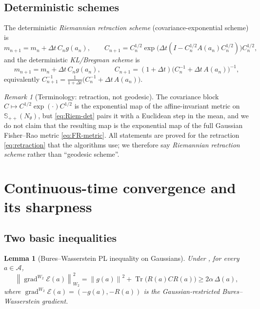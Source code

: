 \documentclass[11pt]{article}
\theoremstyle{plain}
\newtheorem{lemma}[lemma]{Lemma}
\theoremstyle{definition}
\theoremstyle{remark}
\newtheorem{remark}[remark]{Remark}
\newcommand{\Tr}{\operatorname{Tr}}
\newcommand{\SPD}{\mathbb{S}_{++}}
\newcommand{\Id}{I}
\newcommand{\grad}{\operatorname{grad}}
\newcommand{\calE}{\mathcal{E}}
\newcommand{\Aspace}{\mathcal{A}}
\newcommand{\norm}[1]{\left\lVert #1\right\rVert}
\begin{document}
\subsection{Deterministic schemes}

The deterministic \emph{Riemannian retraction scheme} (covariance-exponential scheme) is
\begin{equation}
\label{eq:Riem-det}
    m_{n+1}=m_n+\Delta t\,C_ng(a_n),
    \qquad
    C_{n+1}=C_n^{1/2}\exp\bigl(\Delta t(\Id-C_n^{1/2}A(a_n)C_n^{1/2})\bigr)C_n^{1/2},
\end{equation}
and the deterministic \emph{KL/Bregman scheme} is
\begin{equation}
\label{eq:KL-det}
    m_{n+1}=m_n+\Delta t\,C_ng(a_n),
    \qquad
    C_{n+1}=(1+\Delta t)\bigl(C_n^{-1}+\Delta t\,A(a_n)\bigr)^{-1},
\end{equation}
equivalently $C_{n+1}^{-1}=\tfrac1{1+\Delta t}\bigl(C_n^{-1}+\Delta t\,A(a_n)\bigr)$.

\begin{remark}[Terminology: retraction, not geodesic]
\label{rem:not-geodesic}
The covariance block $C\mapsto C^{1/2}\exp(\cdot)C^{1/2}$ is the exponential map of the
affine-invariant metric on $\SPD(N_\theta)$, but \eqref{eq:Riem-det} pairs it with a Euclidean
step in the mean, and we do not claim that the resulting map is the exponential map of the full
Gaussian Fisher--Rao metric \eqref{eq:FR-metric}. All statements are proved for the retraction
\eqref{eq:retraction} that the algorithms use; we therefore say \emph{Riemannian retraction
scheme} rather than ``geodesic scheme''.
\end{remark}

\section{Continuous-time convergence and its sharpness}
\label{sec:cont-conv}

\subsection{Two basic inequalities}
\label{sec:basic}

\begin{lemma}[Bures--Wasserstein PL inequality on Gaussians]
\label{lem:W2-PL}
Under , for every $a\in\Aspace$,
\[
    \norm{\grad^{W_2}\calE(a)}_{W_2}^2
    =\norm{g(a)}^2+\Tr\bigl(R(a)CR(a)\bigr)
    \geq2\alpha\,\Delta(a),
\]
where $\grad^{W_2}\calE(a)=(-g(a),-R(a))$ is the Gaussian-restricted Bures--Wasserstein gradient.
\end{lemma}
\end{document}
